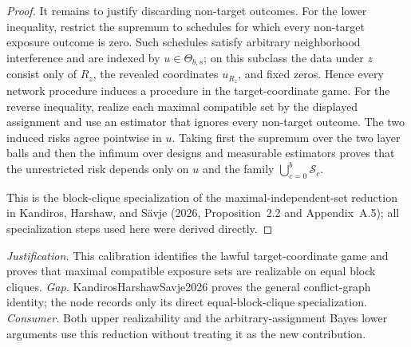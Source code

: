\documentclass{article}
\begin{document}
\begin{proof}
It remains to justify discarding non-target outcomes. For the lower inequality, restrict the supremum to schedules for which every non-target exposure outcome is zero. Such schedules satisfy arbitrary neighborhood interference and are indexed by \(u\in\Theta_{b,s}\); on this subclass the data under \(z\) consist only of \(R_z\), the revealed coordinates \(u_{R_z}\), and fixed zeros. Hence every network procedure induces a procedure in the target-coordinate game. For the reverse inequality, realize each maximal compatible set by the displayed assignment and use an estimator that ignores every non-target outcome. The two induced risks agree pointwise in \(u\). Taking first the supremum over the two layer balls and then the infimum over designs and measurable estimators proves that the unrestricted risk depends only on \(u\) and the family \(\bigcup_{c=0}^b\mathcal S_c\).

This is the block-clique specialization of the maximal-independent-set reduction in Kandiros, Harshaw, and S\"avje (2026, Proposition~2.2 and Appendix~A.5); all specialization steps used here were derived directly.
\end{proof}
\par\smallskip\noindent \textit{Justification.} This calibration identifies the lawful target-coordinate game and proves that maximal compatible exposure sets are realizable on equal block cliques. \textit{Gap.} KandirosHarshawSavje2026 proves the general conflict-graph identity; the node records only its direct equal-block-clique specialization. \textit{Consumer.} Both upper realizability and the arbitrary-assignment Bayes lower arguments use this reduction without treating it as the new contribution.
\end{document}
